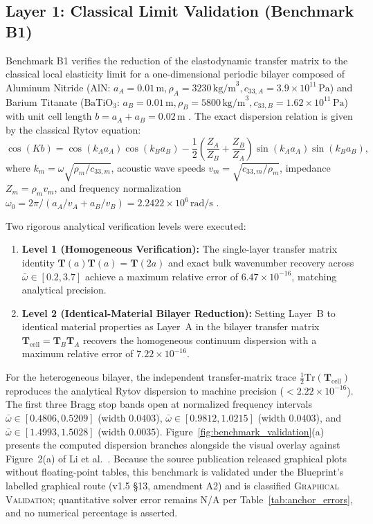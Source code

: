 \subsection{Layer 1: Classical Limit Validation (Benchmark B1)}
\label{sec:classical_limit}
Benchmark B1 verifies the reduction of the elastodynamic transfer matrix to the classical local elasticity limit for a one-dimensional periodic bilayer composed of Aluminum Nitride ($\mathrm{AlN}$: $a_A = 0.01\,\mathrm{m}, \rho_A = 3230\,\mathrm{kg/m}^3, c_{33,A} = 3.9 \times 10^{11}\,\mathrm{Pa}$) and Barium Titanate ($\mathrm{BaTiO_3}$: $a_B = 0.01\,\mathrm{m}, \rho_B = 5800\,\mathrm{kg/m}^3, c_{33,B} = 1.62 \times 10^{11}\,\mathrm{Pa}$) with unit cell length $b = a_A + a_B = 0.02\,\mathrm{m}$ \cite{li2024anchorB, zhengwei2009}. The exact dispersion relation is given by the classical Rytov equation:
\begin{equation}
\cos(K b) = \cos(k_A a_A) \cos(k_B a_B) - \frac{1}{2}\left( \frac{Z_A}{Z_B} + \frac{Z_B}{Z_A} \right) \sin(k_A a_A) \sin(k_B a_B),
\label{eq:rytov}
\end{equation}
where $k_m = \omega \sqrt{\rho_m / c_{33,m}}$, acoustic wave speeds $v_m = \sqrt{c_{33,m} / \rho_m}$, impedance $Z_m = \rho_m v_m$, and frequency normalization $\omega_0 = 2\pi / (a_A/v_A + a_B/v_B) = 2.2422 \times 10^6\,\mathrm{rad/s}$ \cite{li2024anchorB}.

Two rigorous analytical verification levels were executed:
\begin{enumerate}
  \item \textbf{Level 1 (Homogeneous Verification):} The single-layer transfer matrix identity $\mathbf{T}(a)\mathbf{T}(a) = \mathbf{T}(2a)$ and exact bulk wavenumber recovery across $\bar{\omega} \in [0.2, 3.7]$ achieve a maximum relative error of $6.47 \times 10^{-16}$, matching analytical precision.
  \item \textbf{Level 2 (Identical-Material Bilayer Reduction):} Setting Layer~B to identical material properties as Layer~A in the bilayer transfer matrix $\mathbf{T}_{\mathrm{cell}} = \mathbf{T}_B \mathbf{T}_A$ recovers the homogeneous continuum dispersion with a maximum relative error of $7.22 \times 10^{-16}$.
\end{enumerate}
For the heterogeneous bilayer, the independent transfer-matrix trace $\frac{1}{2}\mathrm{Tr}(\mathbf{T}_{\mathrm{cell}})$ reproduces the analytical Rytov dispersion to machine precision ($< 2.22 \times 10^{-16}$). The first three Bragg stop bands open at normalized frequency intervals $\bar{\omega} \in [0.4806, 0.5209]$ (width $0.0403$), $\bar{\omega} \in [0.9812, 1.0215]$ (width $0.0403$), and $\bar{\omega} \in [1.4993, 1.5028]$ (width $0.0035$). Figure~\ref{fig:benchmark_validation}(a) presents the computed dispersion branches alongside the visual overlay against Figure~2(a) of Li et al.\ \cite{li2024anchorB}. Because the source publication released graphical plots without floating-point tables, this benchmark is validated under the Blueprint's labelled graphical route (v1.5 \S13, amendment A2) and is classified \textsc{Graphical Validation}; quantitative solver error remains N/A per Table~\ref{tab:anchor_errors}, and no numerical percentage is asserted.

